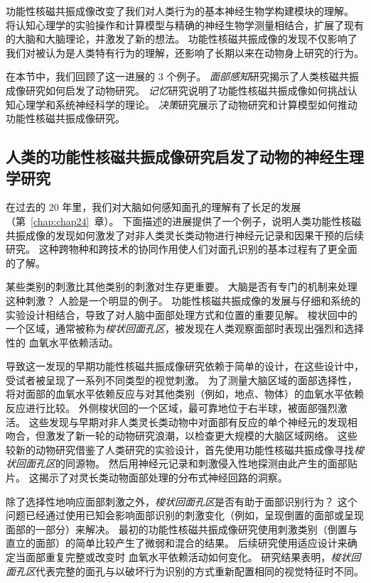 功能性核磁共振成像改变了我们对人类行为的基本神经生物学构建模块的理解。
将认知心理学的实验操作和计算模型与精确的神经生物学测量相结合，扩展了现有的大脑和大脑理论，并激发了新的想法。
功能性核磁共振成像的发现不仅影响了我们对被认为是人类特有行为的理解，还影响了长期以来在动物身上研究的行为。


在本节中，我们回顾了这一进展的 3 个例子。
\textit{面部感知}研究揭示了人类核磁共振成像研究如何启发了动物研究。
\textit{记忆}研究说明了功能性核磁共振成像如何挑战认知心理学和系统神经科学的理论。
\textit{决策}研究展示了动物研究和计算模型如何推动功能性核磁共振成像研究。


\subsection{人类的功能性核磁共振成像研究启发了动物的神经生理学研究}

在过去的 20 年里，我们对大脑如何感知面孔的理解有了长足的发展（第~\ref{chap:chap24}~章）。 
下面描述的进展提供了一个例子，说明人类功能性核磁共振成像的发现如何激发了对非人类灵长类动物进行神经元记录和因果干预的后续研究。
这种跨物种和跨技术的协同作用使人们对面孔识别的基本过程有了更全面的了解。


某些类别的刺激比其他类别的刺激对生存更重要。 
大脑是否有专门的机制来处理这种刺激？ 
人脸是一个明显的例子。 
功能性核磁共振成像的发展与仔细和系统的实验设计相结合，导致了对人脑中面部处理方式和位置的重要见解。 
梭状回中的一个区域，通常被称为\textit{梭状回面孔区}，被发现在人类观察面部时表现出强烈和选择性的 血氧水平依赖活动。


导致这一发现的早期功能性核磁共振成像研究依赖于简单的设计，在这些设计中，受试者被呈现了一系列不同类型的视觉刺激。
为了测量大脑区域的面部选择性，将对面部的血氧水平依赖反应与对其他类别（例如，地点、物体）的血氧水平依赖反应进行比较。 
外侧梭状回的一个区域，最可靠地位于右半球，被面部强烈激活。
这些发现与早期对非人类灵长类动物中对面部有反应的单个神经元的发现相吻合，但激发了新一轮的动物研究浪潮，以检查更大规模的大脑区域网络。
这些较新的动物研究借鉴了人类研究的实验设计，首先使用功能性核磁共振成像寻找\textit{梭状回面孔区}的同源物。
然后用神经元记录和刺激侵入性地探测由此产生的面部贴片。
这揭示了对灵长类动物面部处理的分布式神经回路的洞察。


除了选择性地响应面部刺激之外，\textit{梭状回面孔区}是否有助于面部识别行为？ 
这个问题已经通过使用已知会影响面部识别的刺激变化（例如，呈现倒置的面部或呈现面部的一部分）来解决。 
最初的功能性核磁共振成像研究使用刺激类别（倒置与直立的面部）的简单比较产生了微弱和混合的结果。
后续研究使用适应设计来确定当面部重复完整或改变时 血氧水平依赖活动如何变化。
研究结果表明，\textit{梭状回面孔区}代表完整的面孔与以破坏行为识别的方式重新配置相同的视觉特征时不同。



